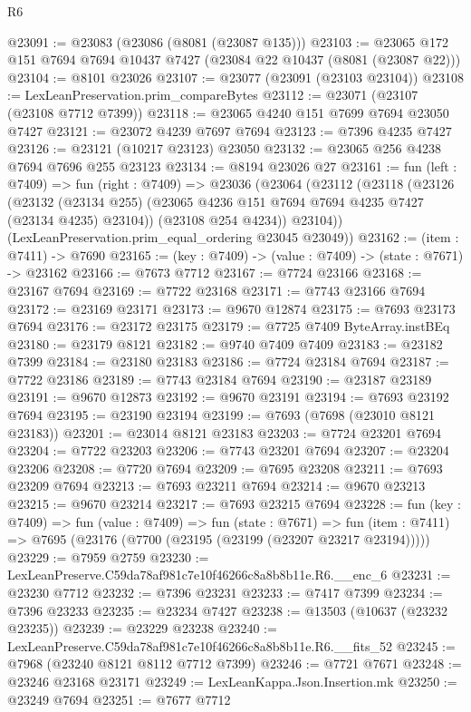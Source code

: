 \begin{lexlean}{R6}
\begin{coremodule}
@23091 := @23083 (@23086 (@8081 (@23087 @135)))
@23103 := @23065 @172 @151 @7694 @7694 @10437 @7427 (@23084 @22 @10437 (@8081 (@23087 @22)))
@23104 := @8101 @23026
@23107 := @23077 (@23091 (@23103 @23104))
@23108 := LexLeanPreservation.prim_compareBytes
@23112 := @23071 (@23107 (@23108 @7712 @7399))
@23118 := @23065 @4240 @151 @7699 @7694 @23050 @7427
@23121 := @23072 @4239 @7697 @7694
@23123 := @7396 @4235 @7427
@23126 := @23121 (@10217 @23123) @23050
@23132 := @23065 @256 @4238 @7694 @7696 @255 @23123
@23134 := @8194 @23026 @27
@23161 := fun (left : @7409) =>
  fun (right : @7409) =>
  @23036
    (@23064
      (@23112
        (@23118
          (@23126
            (@23132 (@23134 @255) (@23065 @4236 @151 @7694 @7694 @4235 @7427 (@23134 @4235) @23104))
            (@23108 @254 @4234))
          @23104))
      (LexLeanPreservation.prim_equal_ordering @23045 @23049))
@23162 := (item : @7411) -> @7690
@23165 := (key : @7409) -> (value : @7409) -> (state : @7671) -> @23162
@23166 := @7673 @7712
@23167 := @7724 @23166
@23168 := @23167 @7694
@23169 := @7722 @23168
@23171 := @7743 @23166 @7694
@23172 := @23169 @23171
@23173 := @9670 @12874
@23175 := @7693 @23173 @7694
@23176 := @23172 @23175
@23179 := @7725 @7409 ByteArray.instBEq
@23180 := @23179 @8121
@23182 := @9740 @7409 @7409
@23183 := @23182 @7399
@23184 := @23180 @23183
@23186 := @7724 @23184 @7694
@23187 := @7722 @23186
@23189 := @7743 @23184 @7694
@23190 := @23187 @23189
@23191 := @9670 @12873
@23192 := @9670 @23191
@23194 := @7693 @23192 @7694
@23195 := @23190 @23194
@23199 := @7693 (@7698 (@23010 @8121 @23183))
@23201 := @23014 @8121 @23183
@23203 := @7724 @23201 @7694
@23204 := @7722 @23203
@23206 := @7743 @23201 @7694
@23207 := @23204 @23206
@23208 := @7720 @7694
@23209 := @7695 @23208
@23211 := @7693 @23209 @7694
@23213 := @7693 @23211 @7694
@23214 := @9670 @23213
@23215 := @9670 @23214
@23217 := @7693 @23215 @7694
@23228 := fun (key : @7409) =>
  fun (value : @7409) =>
  fun (state : @7671) =>
  fun (item : @7411) => @7695 (@23176 (@7700 (@23195 (@23199 (@23207 @23217 @23194)))))
@23229 := @7959 @2759
@23230 := LexLeanPreserve.C59da78af981c7e10f46266c8a8b8b11e.R6.__enc_6
@23231 := @23230 @7712
@23232 := @7396 @23231
@23233 := @7417 @7399
@23234 := @7396 @23233
@23235 := @23234 @7427
@23238 := @13503 (@10637 (@23232 @23235))
@23239 := @23229 @23238
@23240 := LexLeanPreserve.C59da78af981c7e10f46266c8a8b8b11e.R6.__fits_52
@23245 := @7968 (@23240 @8121 @8112 @7712 @7399)
@23246 := @7721 @7671
@23248 := @23246 @23168 @23171
@23249 := LexLeanKappa.Json.Insertion.mk
@23250 := @23249 @7694
@23251 := @7677 @7712

\end{coremodule}
\end{lexlean}

